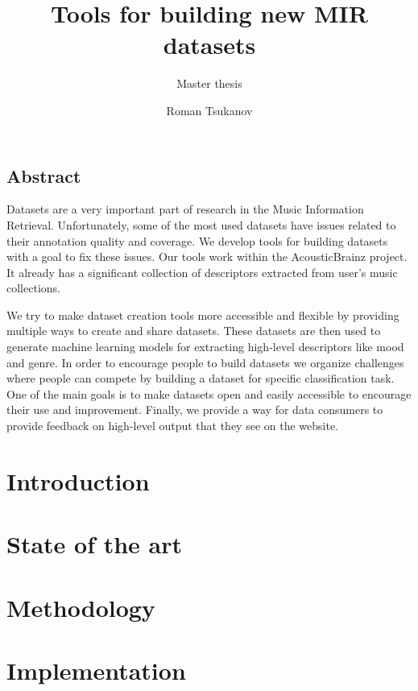 \documentclass[12pt,a4paper,twoside]{tesi_upf}
\title{Tools for building new MIR datasets}
\subtitle{Master thesis}
\author{Roman Tsukanov}
\begin{document}
\frontmatter
\maketitle

\cleardoublepage

\section*{\Large Abstract}
Datasets are a very important part of research in the Music Information Retrieval. Unfortunately, some of the most used datasets have issues related to their annotation quality and coverage. We develop tools for building datasets with a goal to fix these issues. Our tools work within the AcousticBrainz project. It already has a significant collection of descriptors extracted from user's music collections.

We try to make dataset creation tools more accessible and flexible by providing multiple ways to create and share datasets. These datasets are then used to generate machine learning models for extracting high-level descriptors like mood and genre. In order to encourage people to build datasets we organize challenges where people can compete by building a dataset for specific classification task. One of the main goals is to make datasets open and easily accessible to encourage their use and improvement. Finally, we provide a way for data consumers to provide feedback on high-level output that they see on the website.

\cleardoublepage

\tableofcontents

\mainmatter

\chapter{Introduction}


\chapter{State of the art}


\chapter{Methodology}


\chapter{Implementation}

\end{document}

